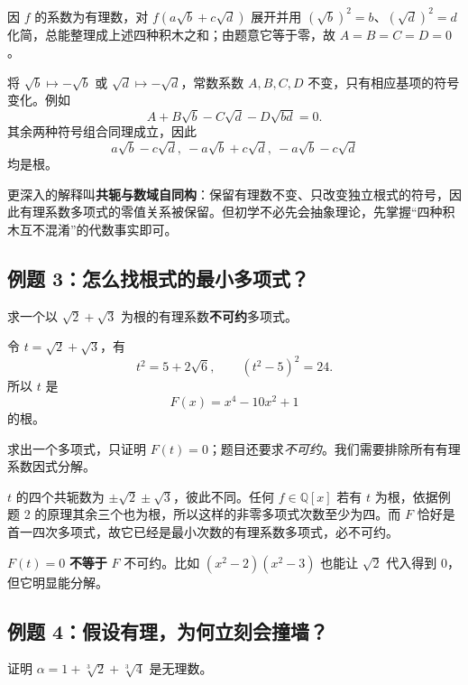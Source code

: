 \documentclass[12pt,a4paper,UTF8,fontset=none]{ctexart}
\begin{document}
 因 $f$ 的系数为有理数，对 $f(a\sqrt b+c\sqrt d)$ 展开并用 $(\sqrt b)^2=b$、$(\sqrt d)^2=d$ 化简，总能整理成上述四种积木之和；由题意它等于零，故 $A=B=C=D=0$。

 将 $\sqrt b\mapsto-\sqrt b$ 或 $\sqrt d\mapsto-\sqrt d$，常数系数 $A,B,C,D$ 不变，只有相应基项的符号变化。例如
\[
A+B\sqrt b-C\sqrt d-D\sqrt{bd}=0.
\]
其余两种符号组合同理成立，因此
\[
\boxed{a\sqrt b-c\sqrt d,\ -a\sqrt b+c\sqrt d,\ -a\sqrt b-c\sqrt d}
\]
均是根。\proofdone

\begin{whybox}
更深入的解释叫\textbf{共轭与数域自同构}：保留有理数不变、只改变独立根式的符号，因此有理系数多项式的零值关系被保留。但初学不必先会抽象理论，先掌握“四种积木互不混淆”的代数事实即可。
\end{whybox}

\subsection{例题 3：怎么找根式的最小多项式？}
\begin{questionbox}[黑板例题 3]
求一个以 $\sqrt2+\sqrt3$ 为根的有理系数\textbf{不可约}多项式。
\end{questionbox}

 令 $t=\sqrt2+\sqrt3$，有
\[
 t^2=5+2\sqrt6,\qquad (t^2-5)^2=24.
\]
所以 $t$ 是
\[
\boxed{F(x)=x^4-10x^2+1}
\]
的根。

 求出一个多项式，只证明 $F(t)=0$；题目还要求\emph{不可约}。我们需要排除所有有理系数因式分解。

 $t$ 的四个共轭数为 $\pm\sqrt2\pm\sqrt3$，彼此不同。任何 $f\in\mathbb Q[x]$ 若有 $t$ 为根，依据例题 2 的原理其余三个也为根，所以这样的非零多项式次数至少为四。而 $F$ 恰好是首一四次多项式，故它已经是最小次数的有理系数多项式，必不可约。\proofdone

\begin{trapbox}
$F(t)=0$ \textbf{不等于} $F$ 不可约。比如 $(x^2-2)(x^2-3)$ 也能让 $\sqrt2$ 代入得到 $0$，但它明显能分解。
\end{trapbox}

\subsection{例题 4：假设有理，为何立刻会撞墙？}
\begin{questionbox}[黑板例题 4]
证明 $\alpha=1+\sqrt[3]2+\sqrt[3]4$ 是无理数。
\end{questionbox}
\end{document}
